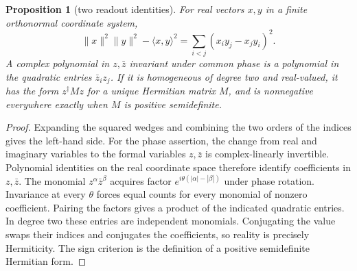 \documentclass[11pt,reqno]{amsart}
\newtheorem{proposition}[theorem]{Proposition}
\theoremstyle{definition}
\theoremstyle{remark}
\numberwithin{equation}{section}
\begin{document}
\begin{proposition}[two readout identities]\label{m1:readout-identities}
For real vectors \(x,y\) in a finite orthonormal coordinate
system,
\[
 \|x\|^2\|y\|^2-\langle x,y\rangle^2
 =\sum_{i<j}(x_i y_j-x_j y_i)^2 .
\]
A complex polynomial in \(z,\bar z\) invariant under common
phase is a polynomial in the quadratic entries \(\bar z_i z_j\).
If it is homogeneous of degree two and real-valued, it has
the form \(z^\dagger Mz\) for a unique Hermitian matrix \(M\),
and is nonnegative everywhere exactly when \(M\) is positive
semidefinite.
\end{proposition}
\begin{proof}
Expanding the squared wedges and combining the two orders
of the indices gives the left-hand side. For the phase
assertion, the change from real and imaginary variables to the
formal variables \(z,\bar z\) is complex-linearly invertible.
Polynomial identities on the real coordinate space therefore
identify coefficients in \(z,\bar z\). The monomial
\(z^\alpha\bar z^\beta\) acquires factor
\(e^{i\theta(|\alpha|-|\beta|)}\) under phase rotation.
Invariance at every \(\theta\) forces equal counts for every
monomial of nonzero coefficient. Pairing the factors gives a
product of the indicated quadratic entries. In degree two
these entries are independent monomials. Conjugating the value
swaps their indices and conjugates the coefficients, so reality
is precisely Hermiticity. The sign criterion is the definition
of a positive semidefinite Hermitian form.
\end{proof}
\end{document}

